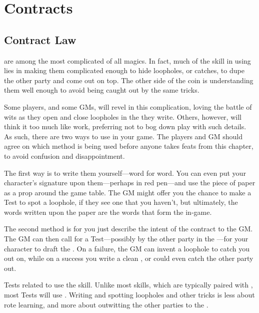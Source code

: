 \chapter{Contracts}

\section{Contract Law}

\capital{\contracts} are among the most complicated of all magics.
In fact, much of the skill in using {\contracts} lies in making them complicated enough to hide loopholes, or catches, to dupe the other party and come out on top.
The other side of the coin is understanding them well enough to avoid being caught out by the same tricks.

Some players, and some GMs, will revel in this complication, loving the battle of wits as they open and close loopholes in the {\contracts} they write.
Others, however, will think it too much like work, preferring not to bog down play with such details.
As such, there are two ways to use {\contracts} in your game.
The players and GM should agree on which method is being used before anyone takes feats from this chapter, to avoid confusion and disappointment.

The first way is to write them yourself---word for word.
You can even put your character's signature upon them---perhaps in red pen---and use the piece of paper as a prop around the game table.
The GM might offer you the chance to make a Test to spot a loophole, if they see one that you haven't, but ultimately, the words written upon the paper are the words that form the {\contract} in-game.

The second method is for you just describe the intent of the contract to the GM.
The GM can then call for a Test---possibly {\opposed} by the other party in the {\contract}---for your character to draft the {\contract}.
On a failure, the GM can invent a loophole to catch you out on, while on a success you write a clean {\contract}, or could even catch the other party out.

Tests related to {\contracts} use the  skill.
Unlike most  skills, which are typically paired with , most  Tests will use .
Writing and spotting loopholes and other tricks is less about rote learning, and more about outwitting the other parties to the {\contract}.

